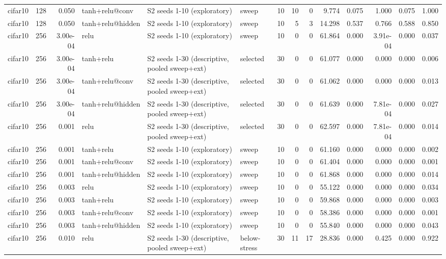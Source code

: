\begin{table}[htbp]
{\begin{tabular}{@{}lrrlllrrrrrrrr@{}}
cifar10 & 128 & 0.050 & tanh+relu@conv & S2 seeds 1-10 (exploratory) & sweep & 10 & 10 & 0 & 9.774 & 0.075 & 1.000 & 0.075 & 1.000 \\
cifar10 & 128 & 0.050 & tanh+relu@hidden & S2 seeds 1-10 (exploratory) & sweep & 10 & 5 & 3 & 14.298 & 0.537 & 0.766 & 0.588 & 0.850 \\
cifar10 & 256 & 3.00e-04 & relu & S2 seeds 1-10 (exploratory) & sweep & 10 & 0 & 0 & 61.864 & 0.000 & 3.91e-04 & 0.000 & 0.037 \\
cifar10 & 256 & 3.00e-04 & tanh+relu & S2 seeds 1-30 (descriptive, pooled sweep+ext) & selected & 30 & 0 & 0 & 61.077 & 0.000 & 0.000 & 0.000 & 0.006 \\
cifar10 & 256 & 3.00e-04 & tanh+relu@conv & S2 seeds 1-30 (descriptive, pooled sweep+ext) & selected & 30 & 0 & 0 & 61.062 & 0.000 & 0.000 & 0.000 & 0.013 \\
cifar10 & 256 & 3.00e-04 & tanh+relu@hidden & S2 seeds 1-30 (descriptive, pooled sweep+ext) & selected & 30 & 0 & 0 & 61.639 & 0.000 & 7.81e-04 & 0.000 & 0.027 \\
cifar10 & 256 & 0.001 & relu & S2 seeds 1-30 (descriptive, pooled sweep+ext) & selected & 30 & 0 & 0 & 62.597 & 0.000 & 7.81e-04 & 0.000 & 0.014 \\
cifar10 & 256 & 0.001 & tanh+relu & S2 seeds 1-10 (exploratory) & sweep & 10 & 0 & 0 & 61.160 & 0.000 & 0.000 & 0.000 & 0.002 \\
cifar10 & 256 & 0.001 & tanh+relu@conv & S2 seeds 1-10 (exploratory) & sweep & 10 & 0 & 0 & 61.404 & 0.000 & 0.000 & 0.000 & 0.001 \\
cifar10 & 256 & 0.001 & tanh+relu@hidden & S2 seeds 1-10 (exploratory) & sweep & 10 & 0 & 0 & 61.868 & 0.000 & 0.000 & 0.000 & 0.014 \\
cifar10 & 256 & 0.003 & relu & S2 seeds 1-10 (exploratory) & sweep & 10 & 0 & 0 & 55.122 & 0.000 & 0.000 & 0.000 & 0.034 \\
cifar10 & 256 & 0.003 & tanh+relu & S2 seeds 1-10 (exploratory) & sweep & 10 & 0 & 0 & 59.868 & 0.000 & 0.000 & 0.000 & 0.003 \\
cifar10 & 256 & 0.003 & tanh+relu@conv & S2 seeds 1-10 (exploratory) & sweep & 10 & 0 & 0 & 58.386 & 0.000 & 0.000 & 0.000 & 0.001 \\
cifar10 & 256 & 0.003 & tanh+relu@hidden & S2 seeds 1-10 (exploratory) & sweep & 10 & 0 & 0 & 55.840 & 0.000 & 0.000 & 0.000 & 0.043 \\
cifar10 & 256 & 0.010 & relu & S2 seeds 1-30 (descriptive, pooled sweep+ext) & below-stress & 30 & 11 & 17 & 28.836 & 0.000 & 0.425 & 0.000 & 0.922 \\

\end{tabular}}
\end{table}
